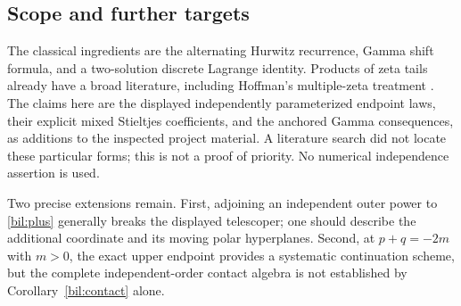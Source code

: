 \subsection{Scope and further targets}

The classical ingredients are the alternating Hurwitz recurrence,
Gamma shift formula, and a two-solution discrete Lagrange identity.
Products of zeta tails already have a broad literature, including
Hoffman's multiple-zeta treatment \cite{bil:Hoffman}. The claims here
are the displayed independently parameterized endpoint laws, their
explicit mixed Stieltjes coefficients, and the anchored Gamma
consequences, as additions to the inspected project material. A
literature search did not locate these particular forms; this is not
a proof of priority. No numerical independence assertion is used.

Two precise extensions remain. First, adjoining an independent outer
power to \eqref{bil:plus} generally breaks the displayed telescoper;
one should describe the additional coordinate and its moving polar
hyperplanes. Second, at $p+q=-2m$ with $m>0$, the exact upper endpoint
provides a systematic continuation scheme, but the complete
independent-order contact algebra is not established by
Corollary~\ref{bil:contact} alone.
